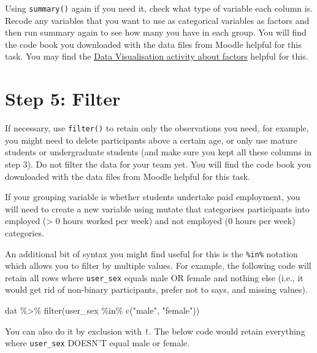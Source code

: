 \documentclass[
  oneside]{book}
\newenvironment{Shaded}{\begin{snugshade}}{\end{snugshade}}
\newcommand{\FunctionTok}[1]{\textcolor[rgb]{0.00,0.00,0.00}{#1}}
\newcommand{\NormalTok}[1]{#1}
\newcommand{\SpecialCharTok}[1]{\textcolor[rgb]{0.00,0.00,0.00}{#1}}
\newcommand{\StringTok}[1]{\textcolor[rgb]{0.31,0.60,0.02}{#1}}
\begin{document}
Using \texttt{summary()} again if you need it, check what type of variable each column is. Recode any variables that you want to use as categorical variables as factors and then run summary again to see how many you have in each group. You will find the code book you downloaded with the data files from Moodle helpful for this task. You may find the \href{https://psyteachr.github.io/ug1-practical/intro-to-data-viz.html\#activity-3-factors}{Data Visualisation activity about factors} helpful for this.

\hypertarget{step-5-filter}{%
\section{Step 5: Filter}\label{step-5-filter}}

If necessary, use \texttt{filter()} to retain only the observations you need, for example, you might need to delete participants above a certain age, or only use mature students or undergraduate students (and make sure you kept all these columns in step 3). Do not filter the data for your team yet. You will find the code book you downloaded with the data files from Moodle helpful for this task.

If your grouping variable is whether students undertake paid employment, you will need to create a new variable using mutate that categorises participants into employed (\textgreater{} 0 hours worked per week) and not employed (0 hours per week) categories.

An additional bit of syntax you might find useful for this is the \texttt{\%in\%} notation which allows you to filter by multiple values. For example, the following code will retain all rows where \texttt{user\_sex} equals male OR female and nothing else (i.e., it would get rid of non-binary participants, prefer not to says, and missing values).

\begin{Shaded}
\begin{Highlighting}[]
\NormalTok{dat }\SpecialCharTok{\%\textgreater{}\%}
  \FunctionTok{filter}\NormalTok{(user\_sex }\SpecialCharTok{\%in\%} \FunctionTok{c}\NormalTok{(}\StringTok{"male"}\NormalTok{, }\StringTok{"female"}\NormalTok{))}
\end{Highlighting}
\end{Shaded}

You can also do it by exclusion with \texttt{!}. The below code would retain everything where \texttt{user\_sex} DOESN'T equal male or female.
\end{document}
